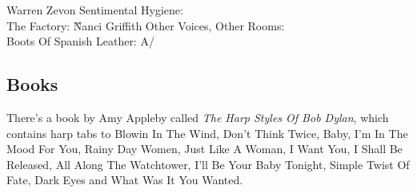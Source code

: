\begin{articlelayout}
Warren Zevon Sentimental Hygiene: \\ The Factory: \G


Nanci Griffith Other Voices, Other Rooms: \\ Boots Of Spanish
Leather: A/\D
\subsection*{Books}

There's a book by Amy Appleby called \emph{The Harp Styles Of Bob
Dylan}, which contains harp tabs to Blowin In The Wind, Don't Think
Twice, Baby, I'm In The Mood For You, Rainy Day Women, Just Like A
Woman, I Want You, I Shall Be Released, All Along The Watchtower, I'll
Be Your Baby Tonight, Simple Twist Of Fate, Dark Eyes and What Was It
You Wanted.




\end{articlelayout}
